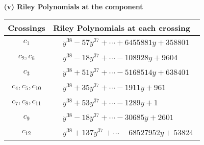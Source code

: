 \documentclass[1p]{elsarticle_modified}
\theoremstyle{definition}
\begin{document}
\flushleft \textbf{(v) Riley Polynomials at the component}\newline \\
\begin{tabular}{m{50pt}|m{274pt}}
Crossings & \hspace{64pt}Riley Polynomials at each crossing \\
\hline $$\begin{aligned}c_{1}\end{aligned}$$&$\begin{aligned}
&y^{38}-57 y^{37}+\cdots+6455881 y+358801
\end{aligned}$\\
\hline $$\begin{aligned}c_{2},c_{6}\end{aligned}$$&$\begin{aligned}
&y^{38}-18 y^{37}+\cdots-108928 y+9604
\end{aligned}$\\
\hline $$\begin{aligned}c_{3}\end{aligned}$$&$\begin{aligned}
&y^{38}+51 y^{37}+\cdots-5168514 y+638401
\end{aligned}$\\
\hline $$\begin{aligned}c_{4},c_{5},c_{10}\end{aligned}$$&$\begin{aligned}
&y^{38}+35 y^{37}+\cdots-1911 y+961
\end{aligned}$\\
\hline $$\begin{aligned}c_{7},c_{8},c_{11}\end{aligned}$$&$\begin{aligned}
&y^{38}+53 y^{37}+\cdots-1289 y+1
\end{aligned}$\\
\hline $$\begin{aligned}c_{9}\end{aligned}$$&$\begin{aligned}
&y^{38}-18 y^{37}+\cdots-30685 y+2601
\end{aligned}$\\
\hline $$\begin{aligned}c_{12}\end{aligned}$$&$\begin{aligned}
&y^{38}+137 y^{37}+\cdots-68527952 y+53824
\end{aligned}$\\
\hline
\end{tabular}\\~\\
\end{document}
